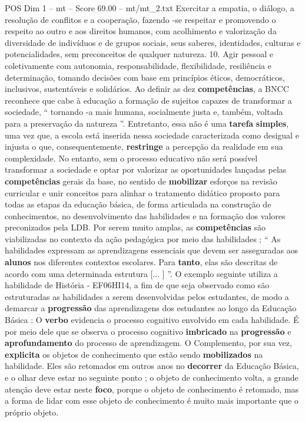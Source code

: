 \begin{textsample}{POS Dim 1 – mt – Score 69.00 – mt/mt\_2.txt}
Exercitar a empatia, o diálogo, a resolução de conflitos e a cooperação, fazendo -se respeitar e promovendo o respeito ao outro e aos direitos humanos, com acolhimento e valorização da diversidade de indivíduos e de grupos sociais, seus saberes, identidades, culturas e potencialidades, sem preconceitos de qualquer natureza. 10.
Agir pessoal e coletivamente com autonomia, responsabilidade, flexibilidade, resiliência e determinação, tomando decisões com base em princípios éticos, democráticos, inclusivos, sustentáveis e solidários.
Ao definir as dez \textbf{competências}, a BNCC reconhece que cabe à educação a formação de sujeitos capazes de transformar a sociedade, “ tornando -a mais humana, socialmente justa e, também, voltada para a preservação da natureza ”.
Entretanto, essa não é uma \textbf{tarefa} \textbf{simples}, uma vez que, a escola está inserida nessa sociedade caracterizada como desigual e injusta o que, consequentemente, \textbf{restringe} a percepção da realidade em sua complexidade.
No entanto, sem o processo educativo não será possível transformar a sociedade e optar por valorizar as oportunidades lançadas pelas \textbf{competências} gerais da base, no sentido de \textbf{mobilizar} esforços na revisão curricular e unir conceitos para alinhar o tratamento didático proposto para todas as etapas da educação básica, de forma articulada na construção de conhecimentos, no desenvolvimento das habilidades e na formação dos valores preconizados pela LDB.
Por serem muito amplas, as \textbf{competências} são viabilizadas no contexto da ação pedagógica por meio das habilidades ; “ As habilidades expressam as aprendizagens essenciais que devem ser asseguradas aos \textbf{alunos} nos diferentes contextos escolares.
Para \textbf{tanto}, elas são descritas de acordo com uma determinada estrutura [... ] ”.
O exemplo seguinte utiliza a habilidade de História - EF06HI14, a fim de que seja observado como são estruturadas as habilidades a serem desenvolvidas pelos estudantes, de modo a demarcar a \textbf{progressão} das aprendizagens dos estudantes ao longo da Educação Básica : O \textbf{verbo} evidencia o processo cognitivo envolvido em cada habilidade.
É por meio dele que se observa o processo cognitivo \textbf{imbricado} na \textbf{progressão} e \textbf{aprofundamento} do processo de aprendizagem.
O Complemento, por sua vez, \textbf{explicita} os objetos de conhecimento que estão sendo \textbf{mobilizados} na habilidade.
Eles são retomados em outros anos no \textbf{decorrer} da Educação Básica, e o olhar deve estar no seguinte ponto ; o objeto de conhecimento volta, a grande atenção deve estar neste \textbf{foco}, porque o objeto de conhecimento é retomado, mas a forma de lidar com esse objeto de conhecimento é muito mais importante que o próprio objeto.

\end{textsample}
